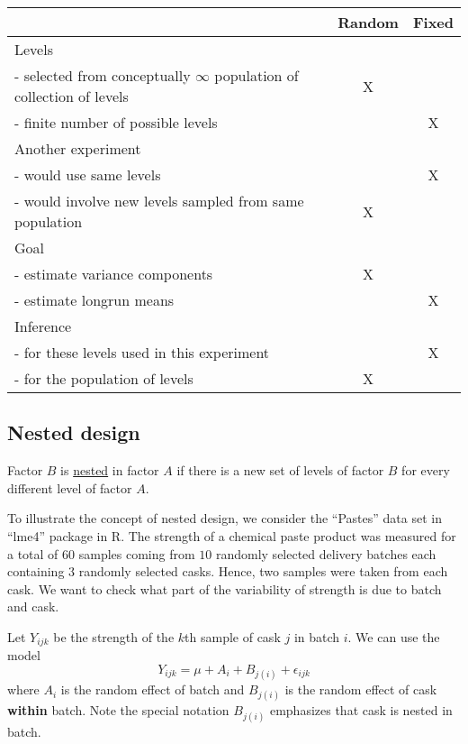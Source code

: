 \begin{table}[H]
	\renewcommand{\arraystretch}{1.5}
	\centering
	\begin{tabular}{lcc}
		\toprule
		& Random & Fixed\\
		\hline
		Levels & & \\
		- selected from conceptually $\infty$ population of collection of levels & X &\\
		- finite number of possible levels & & X\\
		\hline
		Another experiment & & \\
		- would use same levels & & X\\
		- would involve new levels sampled from same population & X &\\
		\hline
		Goal & & \\
		- estimate variance components & X & \\
		- estimate longrun means & &X\\
		\hline
		Inference & & \\
		- for these levels used in this experiment & & X \\
		- for the population of levels & X &\\
		\bottomrule
	\end{tabular}
\end{table}

\subsection*{Nested design}
Factor $B$ is \underline{nested} in factor $A$ if there is a new set of levels of factor $B$ for every different level of factor $A$.

To illustrate the concept of nested design, we consider the ``Pastes'' data set in ``lme4'' package in R.
The strength of a chemical paste product was measured for a total of $60$ samples coming from $10$ randomly selected delivery batches each containing $3$ randomly selected casks.
Hence, two samples were taken from each cask.
We want to check what part of the variability of strength is due to batch and cask.

Let $Y_{ijk}$ be the strength of the $k$th sample of cask $j$ in batch $i$.
We can use the model
$$
Y_{ijk} = \mu + A_i + B_{j(i)} + \epsilon_{ijk}
$$
where $A_i$ is the random effect of batch and $B_{j(i)}$ is the random effect of cask {\bf within} batch.
Note the special notation $B_{j(i)}$ emphasizes that cask is nested in batch.




